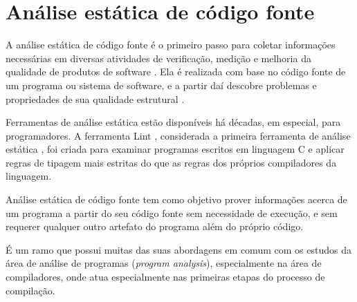 \section{Análise estática de código fonte} \label{analise-estatica}

%
%
%


A análise estática de código fonte é o primeiro passo para coletar informações
necessárias em diversas atividades de verificação, medição e melhoria da
qualidade de produtos de software \cite{Cruz2009, Kirkov2010}. Ela é
realizada com base no código fonte de um programa ou sistema de software, e a
partir daí descobre problemas e propriedades de sua qualidade estrutural
\cite{Chess2007}.

Ferramentas de análise estática estão disponíveis há décadas, em especial,
para programadores. A ferramenta Lint \cite{Johnson1978}, considerada a
primeira ferramenta de análise estática \cite{Gosain2015}, foi criada para
examinar programas escritos em linguagem C e aplicar regras de tipagem mais
estritas do que as regras dos próprios compiladores da linguagem.

%

Análise estática de código fonte tem como objetivo prover
informações acerca de um programa a partir do seu código fonte sem
necessidade de execução, e sem requerer qualquer outro artefato do programa
além do próprio código.

É um ramo que possui muitas das suas abordagens em comum com os estudos da
área de análise de programas ({\it program analysis}), especialmente na área de
compiladores, onde atua especialmente nas primeiras etapas do processo de compilação.

